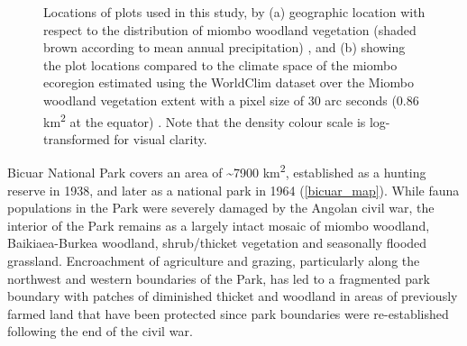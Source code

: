 \documentclass[diversity,article,submit,moreauthors,pdftex]{Definitions/mdpi}
\begin{document}
\begin{figure}[H]
	\centering
    \qquad
{}%
\caption{Locations of plots used in this study, by (a) geographic location with respect to the distribution of miombo woodland vegetation (shaded brown according to mean annual precipitation) \citep{White1983}, and (b) showing the plot locations compared to the climate space of the miombo ecoregion estimated using the WorldClim dataset over the Miombo woodland vegetation extent with a pixel size of 30 arc seconds (0.86 km\textsuperscript{2} at the equator) \citep{Fick2017}. Note that the density colour scale is log-transformed for visual clarity.}
\end{figure}




Bicuar National Park covers an area of \textasciitilde{}7900 km\textsuperscript{2}, established as a hunting reserve in 1938, and later as a national park in 1964 (\autoref{bicuar_map}). While fauna populations in the Park were severely damaged by the Angolan civil war, the interior of the Park remains as a largely intact mosaic of miombo woodland, Baikiaea-Burkea woodland, shrub/thicket vegetation and seasonally flooded grassland. Encroachment of agriculture and grazing, particularly along the northwest and western boundaries of the Park, has led to a fragmented park boundary with patches of diminished thicket and woodland in areas of previously farmed land that have been protected since park boundaries were re-established following the end of the civil war.
\end{document}
